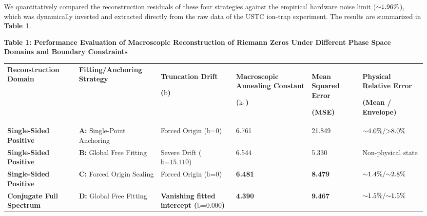 \documentclass[fleqn,10pt]{wlscirep}
\begin{document}
We quantitatively compared the reconstruction residuals of these four
strategies against the empirical hardware noise limit
(\(\text{\ensuremath{\sim}1.96\%}\)), which was dynamically inverted and extracted
directly from the raw data of the USTC ion-trap experiment. The results
are summarized in \textbf{Table 1}.

\textbf{Table 1: Performance Evaluation of Macroscopic Reconstruction of
Riemann Zeros Under Different Phase Space Domains and Boundary
Constraints}

\begin{longtable}[]{@{}llllll@{}}
\toprule
\endhead
\begin{minipage}[t]{0.14\columnwidth}\raggedright
\textbf{Reconstruction Domain}\strut
\end{minipage} & \begin{minipage}[t]{0.14\columnwidth}\raggedright
\textbf{Fitting/Anchoring Strategy}\strut
\end{minipage} & \begin{minipage}[t]{0.14\columnwidth}\raggedright
\textbf{Truncation Drift}

\textbf{(}\(\text{b}\)\textbf{)}\strut
\end{minipage} & \begin{minipage}[t]{0.14\columnwidth}\raggedright
\textbf{Macroscopic Annealing Constant}

\textbf{(}\(\text{k}_{\text{1}}\)\textbf{)}\strut
\end{minipage} & \begin{minipage}[t]{0.14\columnwidth}\raggedright
\textbf{Mean Squared Error}

\textbf{(MSE)}\strut
\end{minipage} & \begin{minipage}[t]{0.14\columnwidth}\raggedright
\textbf{Physical Relative Error}

\textbf{(Mean / Envelope)}\strut
\end{minipage}\tabularnewline
\textbf{Single-Sided Positive} & \textbf{A:} Single-Point Anchoring &
Forced Origin (\(\text{b}\text{=0}\)) & 6.761 & 21.849 &
\(\text{\ensuremath{\sim}4.0\%/>8.0\%}\)\tabularnewline
\textbf{Single-Sided Positive} & \textbf{B:} Global Free Fitting &
Severe Drift (\(\text{b}\text{=15.110}\)) & 6.544 & 5.330 & Non-physical
state\tabularnewline
\textbf{Single-Sided Positive} & \textbf{C:} Forced Origin Scaling &
Forced Origin (\(\text{b}\text{=0}\)) & \textbf{6.481} & \textbf{8.479}
& \(\text{\ensuremath{\sim}1.4\%/\ensuremath{\sim}2.8\%}\)\tabularnewline
\textbf{Conjugate Full Spectrum} & \textbf{D:} Global Free Fitting &
\textbf{Vanishing fitted intercept (}\(\text{b}\text{=0.000}\)\textbf{)} &
\textbf{4.390} & \textbf{9.467} &
\(\text{\ensuremath{\sim}1.5\%/\ensuremath{\sim}1.5\%}\)\tabularnewline
\bottomrule
\end{longtable}
\end{document}
